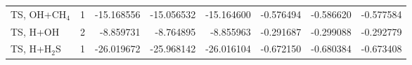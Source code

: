 \begin{tabular}{@{}lc rrr rrr@{}}
TS, OH+CH$_4$ & 1 & \textcolor{pyscfred}{-15.168556} & \textcolor{pyscfred}{-15.056532} & \textcolor{pyscfred}{-15.164600} & \textcolor{pyscfred}{-0.576494} & \textcolor{pyscfred}{-0.586620} & \textcolor{pyscfred}{-0.577584} \\
TS, H+OH & 2 & \textcolor{pyscfred}{-8.859731} & \textcolor{pyscfred}{-8.764895} & \textcolor{pyscfred}{-8.855963} & \textcolor{pyscfred}{-0.291687} & \textcolor{pyscfred}{-0.299088} & \textcolor{pyscfred}{-0.292779} \\
TS, H+H$_2$S & 1 & \textcolor{pyscfred}{-26.019672} & \textcolor{pyscfred}{-25.968142} & \textcolor{pyscfred}{-26.016104} & \textcolor{pyscfred}{-0.672150} & \textcolor{pyscfred}{-0.680384} & \textcolor{pyscfred}{-0.673408} \\
\bottomrule
\end{tabular}
